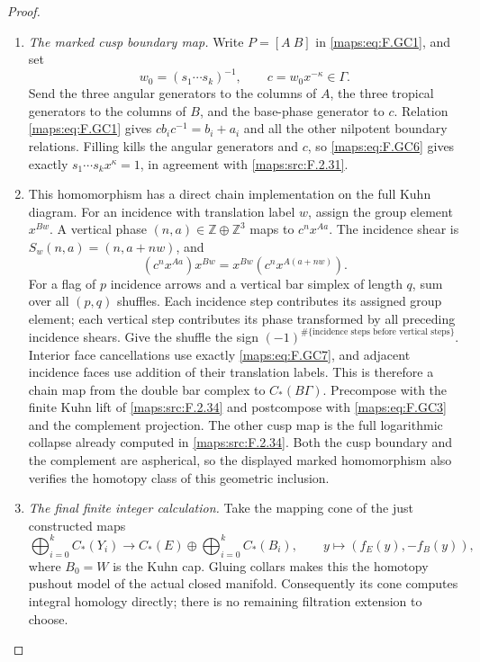 \documentclass[11pt,a4paper]{article}
\theoremstyle{definition}
\begin{document}
\begin{proof}
\begin{enumerate}[label=\arabic*.]
\item \emph{The marked cusp boundary map.}
Write $P=[A\ B]$ in \eqref{maps:eq:F.GC1}, and set
\[
 w_0=(s_1\cdots s_k)^{-1},\qquad
 c=w_0x^{-\kappa}\in\Gamma.
                                                               \tag{F.GC6}\label{maps:eq:F.GC6}
\]
Send the three angular generators to the columns of $A$,
the three tropical generators to the columns of $B$, and
the base-phase generator to $c$.  Relation \eqref{maps:eq:F.GC1} gives
$c b_i c^{-1}=b_i+a_i$ and all the other nilpotent boundary
relations.  Filling kills the angular generators and $c$,
so \eqref{maps:eq:F.GC6} gives exactly
$s_1\cdots s_kx^\kappa=1$, in agreement with \ref{maps:src:F.2.31}.

\item This homomorphism has a direct chain implementation on the
full Kuhn diagram.  For an incidence with translation label
$w$, assign the group element $x^{Bw}$.  A vertical phase
$(n,a)\in\mathbb Z\oplus\mathbb Z^3$ maps to $c^nx^{Aa}$.
The incidence shear is $S_w(n,a)=(n,a+n w)$, and
\[
 (c^nx^{Aa})x^{Bw}=x^{Bw}(c^nx^{A(a+n w)}).                \tag{F.GC7}\label{maps:eq:F.GC7}
\]
For a flag of $p$ incidence arrows and a vertical bar
simplex of length $q$, sum over all $(p,q)$ shuffles.
Each incidence step contributes its assigned group element;
each vertical step contributes its phase transformed by
all preceding incidence shears.  Give the shuffle the sign
$(-1)^{\#\{\text{incidence steps before vertical steps}\}}$.
Interior face cancellations use exactly \eqref{maps:eq:F.GC7}, and adjacent
incidence faces use addition of their translation labels.
This is therefore a chain map from the double bar complex
to $C_*(B\Gamma)$.  Precompose with the finite Kuhn lift of
\ref{maps:src:F.2.34} and postcompose with \eqref{maps:eq:F.GC3} and the complement
projection.  The other cusp map is the full logarithmic
collapse already computed in \ref{maps:src:F.2.34}.
Both the cusp boundary and the complement are aspherical,
so the displayed marked homomorphism also verifies the
homotopy class of this geometric inclusion.

\item \emph{The final finite integer calculation.}
Take the mapping cone of the just constructed maps
\[
 \bigoplus_{i=0}^k C_*(Y_i)\longrightarrow
 C_*(E)\oplus\bigoplus_{i=0}^k C_*(B_i),
 \qquad y\longmapsto(f_E(y),-f_B(y)),                     \tag{F.GC8}\label{maps:eq:F.GC8}
\]
where $B_0=W$ is the Kuhn cap.  Gluing collars makes this
the homotopy pushout model of the actual closed manifold.
Consequently its cone computes integral homology directly;
there is no remaining filtration extension to choose.


\end{enumerate}
\end{proof}
\end{document}
